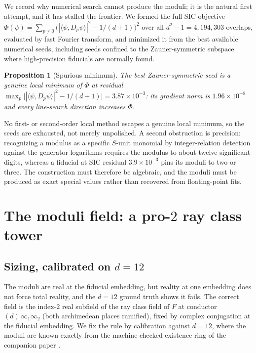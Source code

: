 \documentclass[12pt,a4paper]{article}
\newtheorem{proposition}[theorem]{Proposition}
\newcommand{\Fd}{F}
\begin{document}
We record why numerical search cannot produce the moduli; it is the natural
first attempt, and it has stalled the frontier.  We formed the full SIC objective
$\Phi(\psi) = \sum_{p\neq 0}\big(|\langle\psi,D_p\psi\rangle|^2 - 1/(d+1)\big)^2$
over all $d^2-1 = 4{,}194{,}303$ overlaps, evaluated by fast Fourier transform,
and minimized it from the best available numerical seeds, including seeds
confined to the Zauner-symmetric subspace where high-precision fiducials are
normally found.

\begin{proposition}[Spurious minimum]
\label{prop:spurious}
The best Zauner-symmetric seed is a genuine local minimum of $\Phi$ at residual
$\max_p\big||\langle\psi,D_p\psi\rangle|^2 - 1/(d+1)\big| = 3.87\times 10^{-3}$:
its gradient norm is $1.96\times 10^{-8}$ and every line-search direction
increases $\Phi$.
\end{proposition}

No first- or second-order local method escapes a genuine local minimum, so the
seeds are exhausted, not merely unpolished.  A second obstruction is precision:
recognizing a modulus as a specific $S$-unit monomial by integer-relation
detection against the generator logarithms requires the modulus to about twelve
significant digits, whereas a fiducial at SIC residual $3.9\times 10^{-3}$ pins
its moduli to two or three.  The construction must therefore be algebraic, and
the moduli must be produced as exact special values rather than recovered from
floating-point fits.

\section{The moduli field: a pro-$2$ ray class tower}
\label{sec:tower}

\subsection{Sizing, calibrated on $d=12$}

The moduli are real at the fiducial embedding, but reality at one embedding does
not force total reality, and the $d=12$ ground truth shows it fails.  The correct
field is the index-$2$ real subfield of the ray class field of $\Fd$ at conductor
$(d)\,\infty_1\infty_2$ (both archimedean places ramified), fixed by complex
conjugation at the fiducial embedding.  We fix the rule by calibration against
$d=12$, where the moduli are known exactly from the machine-checked existence
ring of the companion paper \cite{StarkHilbert12}.
\end{document}
